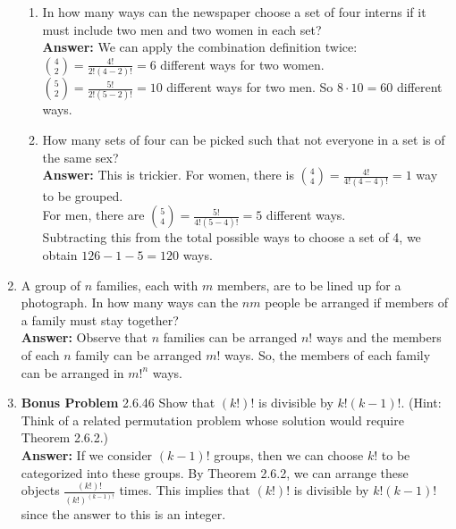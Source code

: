 \documentclass{article}
\begin{document}
\begin{enumerate}
\begin{enumerate}
                \item In how many ways can the newspaper choose a set of four interns if it must include two men and two women in each set?\\
                \textbf{Answer: }We can apply the combination definition twice:\\ $\binom{4}{2} = \frac{4!}{2!(4-2)!} = 6$ different ways for two women.\\
                $\binom{5}{2} = \frac{5!}{2!(5-2)!} = 10$ different ways for two men. So $8 \cdot 10 = 60$ different ways.\\
                
                \item How many sets of four can be picked such that not everyone in a set is of the same sex?\\
                \textbf{Answer: }This is trickier. For women, there is $\binom{4}{4} = \frac{4!}{4!(4-4)!} = 1$ way to be grouped.\\
                For men, there are $\binom{5}{4} = \frac{5!}{4!(5-4)!} = 5$ different ways.\\
                Subtracting this from the total possible ways to choose a set of 4, we obtain $126-1-5 = 120$ ways.\\
            \end{enumerate}
            
        \item A group of $n$ families, each with $m$ members, are to be lined up for a photograph. In how many ways can the $nm$ people be arranged if members of a family must stay together?\\
        \textbf{Answer: }Observe that $n$ families can be arranged $n!$ ways and the members of each $n$ family can be arranged $m!$ ways. So, the members of each family can be arranged in $m!^n$ ways.\\
        
        \item \textbf{Bonus Problem} 2.6.46 Show that $(k!)!$ is divisible by $k!(k-1)!$. (Hint: Think of a related permutation problem whose solution would require Theorem 2.6.2.)\\
        \textbf{Answer: }If we consider $(k-1)!$ groups, then we can choose $k!$ to be categorized into these groups. By Theorem 2.6.2, we can arrange these objects $\frac{(k!)!}{(k!)^{(k-1)!}}$ times. This implies that $(k!)!$ is divisible by $k!(k-1)!$ since the answer to this is an integer.
        
    \end{enumerate}
\end{document}

